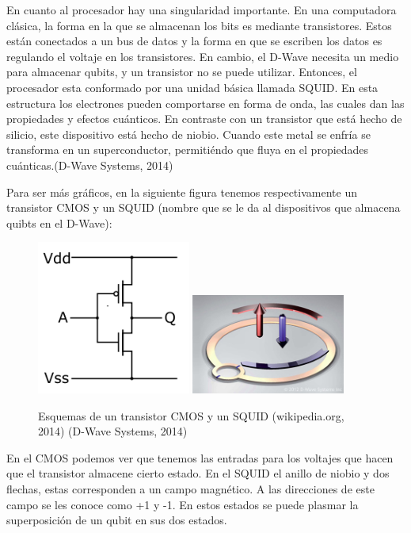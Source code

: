 \documentclass[11pt,a4paper]{article}
\begin{document}
En cuanto al procesador hay una singularidad importante. En una computadora clásica, la forma en la que se almacenan los bits es mediante transistores. Estos están conectados a un bus de datos y la forma en que se escriben los datos es regulando el voltaje en los transistores. En cambio, el D-Wave necesita un medio para almacenar qubits, y un transistor no se puede utilizar. Entonces, el procesador esta conformado por una unidad básica llamada SQUID. En esta estructura los electrones pueden comportarse en forma de onda, las cuales dan las propiedades y efectos cuánticos. En contraste con un transistor que está hecho de silicio, este dispositivo está hecho de niobio. Cuando este metal se enfría se transforma en un superconductor, permitiéndo que fluya en el propiedades cuánticas.(D-Wave Systems, 2014)

Para ser más gráficos, en la siguiente figura tenemos respectivamente un transistor CMOS y un SQUID (nombre que se le da al dispositivos que almacena quibts en el D-Wave):

\begin{figure}[h]
\centering
\includegraphics[width=0.45\textwidth]{cmos}
\includegraphics[width=0.45\textwidth]{squid}
\caption{Esquemas de un transistor CMOS y un SQUID (wikipedia.org, 2014) (D-Wave Systems, 2014)}
\end{figure}

En el CMOS podemos ver que tenemos las entradas para los voltajes que hacen que el transistor almacene cierto estado. En el SQUID el anillo de niobio y dos flechas, estas corresponden a un campo magnético. A las direcciones de este campo se les conoce como +1 y -1. En estos estados se puede plasmar la superposición de un qubit en sus dos estados.
\end{document}
